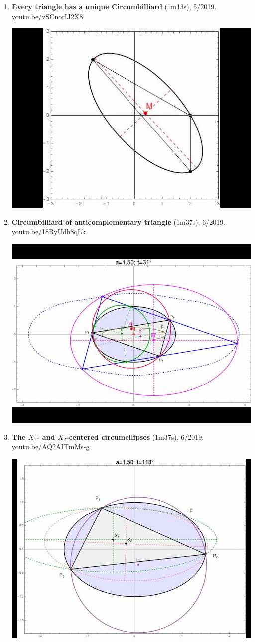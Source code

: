 \documentclass[12pt]{article}
\begin{document}
\begin{enumerate}[resume]
\item \textbf{Every triangle has a unique Circumbilliard} (1m13s), 5/2019. \href{https://youtu.be/vSCnorIJ2X8}{\url{youtu.be/vSCnorIJ2X8}}
\begin{center}\includegraphics[width=.5\textwidth]{pics/vSCnorIJ2X8.jpg}\end{center}
% 
\item \textbf{Circumbilliard of anticomplementary triangle} (1m37s), 6/2019. \href{https://youtu.be/18RyUdh8qLk}{\url{youtu.be/18RyUdh8qLk}}
\begin{center}\includegraphics[width=.5\textwidth]{pics/18RyUdh8qLk.jpg}\end{center}
% 
\item \textbf{The $X_{1}$- and $X_{2}$-centered circumellipses} (1m37s), 6/2019. \href{https://youtu.be/AQ2AITmMs-g}{\url{youtu.be/AQ2AITmMs-g}}
\begin{center}\includegraphics[width=.5\textwidth]{pics/AQ2AITmMs-g.jpg}\end{center}

\end{enumerate}
\end{document}

